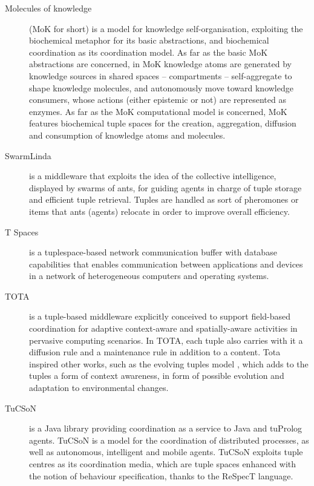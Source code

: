 \documentclass[12pt,a4paper,twoside,openright]{book}
\begin{document}
\begin{description}
 \item[Molecules of knowledge] \cite{mariani2013molecules} (MoK for short) is a model for knowledge self-organisation, exploiting the biochemical metaphor for its basic abstractions, and biochemical coordination as its coordination model.
 As far as the basic MoK abstractions are concerned, in MoK knowledge atoms are generated by knowledge sources in shared spaces -- compartments -- self-aggregate to shape knowledge molecules, and autonomously move toward knowledge consumers, whose actions (either epistemic or not) are represented as enzymes.
 As far as the MoK computational model is concerned, MoK features biochemical tuple spaces for the creation, aggregation, diffusion and consumption of knowledge atoms and molecules.

 \item[SwarmLinda] \cite{swarmlinda} is a middleware that exploits the idea of the collective intelligence, displayed by swarms of ants, for guiding agents in charge of tuple storage and efficient tuple retrieval. Tuples are handled as sort of pheromones or items that ants (agents) relocate in order to improve overall efficiency.

 \item[T Spaces] \cite{tspaces-ibmsj37} is a tuplespace-based network communication buffer with database capabilities that enables communication between applications and devices in a network of heterogeneous computers and operating systems.

 \item[TOTA] \cite{mamei2009acm, tota2} is a tuple-based middleware explicitly conceived to support field-based coordination for adaptive context-aware and spatially-aware activities in pervasive computing scenarios.
 In TOTA, each tuple also carries with it a diffusion rule and a maintenance rule in addition to a content. Tota inspired other works, such as the evolving tuples model \cite{evolvingtuples}, which adds to the tuples a form of context awareness, in form of possible evolution and adaptation to environmental changes.

 \item[TuCSoN] \cite{tucson-aamas99} is a Java library providing coordination as a service to Java and tuProlog agents.
 TuCSoN is a model for the coordination of distributed processes, as well as autonomous, intelligent and mobile agents.
 TuCSoN exploits tuple centres as its coordination media, which are tuple spaces enhanced with the notion of behaviour specification, thanks to the ReSpecT language.
\end{description}
\end{document}
